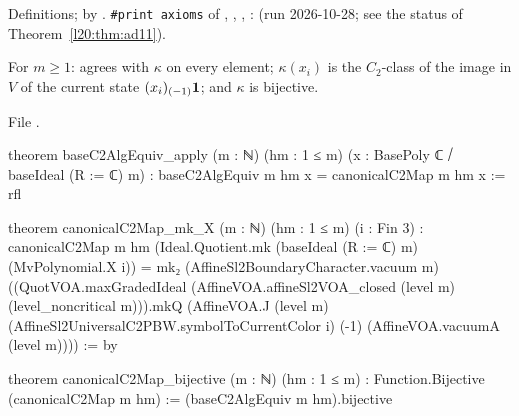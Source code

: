 \begin{status}
Definitions;  by . \texttt{\#print axioms} of ,
, , : 
(run 2026-10-28; see the status of Theorem~\ref{l20:thm:ad11}).
\end{status}

\begin{theorem}\label{l20:thm:canonc2}
For $m\ge1$:  agrees with $\kappa$ on every element; $\kappa(x_i)$ is the $C_2$-class of the image in
$V$ of the current state $(x_i)_{(-1)}\mathbf{1}$; and $\kappa$ is bijective.
\end{theorem}
\noindent File .
\begin{leancode}
theorem baseC2AlgEquiv_apply (m : ℕ) (hm : 1 ≤ m) (x : BasePoly ℂ ⧸ baseIdeal (R := ℂ) m) :
    baseC2AlgEquiv m hm x = canonicalC2Map m hm x := rfl

theorem canonicalC2Map_mk_X (m : ℕ) (hm : 1 ≤ m) (i : Fin 3) :
    canonicalC2Map m hm (Ideal.Quotient.mk (baseIdeal (R := ℂ) m) (MvPolynomial.X i)) =
      mk₂ (AffineSl2BoundaryCharacter.vacuum m)
        ((QuotVOA.maxGradedIdeal (AffineVOA.affineSl2VOA_closed (level m)
          (level_noncritical m))).mkQ
          (AffineVOA.J (level m) (AffineSl2UniversalC2PBW.symbolToCurrentColor i) (-1)
            (AffineVOA.vacuumA (level m)))) := by

theorem canonicalC2Map_bijective (m : ℕ) (hm : 1 ≤ m) :
    Function.Bijective (canonicalC2Map m hm) :=
  (baseC2AlgEquiv m hm).bijective
\end{leancode}

